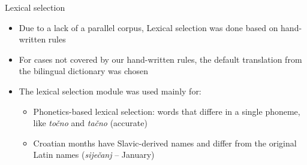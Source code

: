 \documentclass{beamer}
\begin{document}
\begin{frame}{Lexical selection}
\begin{itemize}
\item Due to a lack of a parallel corpus, Lexical selection was done based on hand-written rules
\item For cases not covered by our hand-written rules, the default translation from the bilingual dictionary was chosen
\item The lexical selection module was used mainly for:
\begin{itemize}
	\item Phonetics-based lexical selection: words that differe in a single phoneme, like \emph{to\v{c}no} and \emph{ta\v{c}no} (accurate)
	\item Croatian months have Slavic-derived names and differ from the original Latin names (\emph{sije\v{c}anj} -- January)
\end{itemize}
\end{itemize}
\end{frame}
\end{document}

